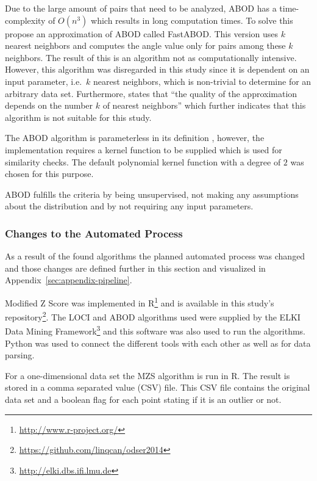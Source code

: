 Due to the large amount of pairs that need to be analyzed, ABOD has a time-complexity of $O(n^{3})$ which results in long computation times. To solve this \citet{kriegel2008angle} propose an approximation of ABOD called FastABOD\@. This version uses $k$ nearest neighbors and computes the angle value only for pairs among these $k$ neighbors. The result of this is an algorithm not as computationally intensive. However, this algorithm was disregarded in this study since it is dependent on an input parameter, i.e.\ $k$ nearest neighbors, which is non-trivial to determine for an arbitrary data set. Furthermore, \citet{kriegel2008angle} states that ``the quality of the approximation depends on the number $k$ of nearest neighbors'' which further indicates that this algorithm is not suitable for this study.


The ABOD algorithm is parameterless in its definition \citep{kriegel2008angle}, however, the implementation requires a kernel function to be supplied which is used for similarity checks. The default polynomial kernel function with a degree of $2$ was chosen for this purpose.


ABOD fulfills the criteria by being unsupervised, not making any assumptions about the distribution and by not requiring any input parameters.


\subsubsection{Changes to the Automated Process}
As a result of the found algorithms the planned automated process was changed and those changes are defined further in this section and visualized in Appendix~\ref{sec:appendix-pipeline}.


Modified Z Score was implemented in \textsf{R}\footnote{\url{http://www.r-project.org/}} and is available in this study's repository\footnote{\url{https://github.com/linqcan/odser2014}}. The LOCI and ABOD algorithms used were supplied by the ELKI Data Mining Framework\footnote{\url{http://elki.dbs.ifi.lmu.de}}\citep{elki2013} and this software was also used to run the algorithms. \textsf{Python} was used to connect the different tools with each other as well as for data parsing.


For a one-dimensional data set the MZS algorithm is run in \textsf{R}. The result is stored in a comma separated value (CSV) file. This CSV file contains the original data set and a boolean flag for each point stating if it is an outlier or not. 


